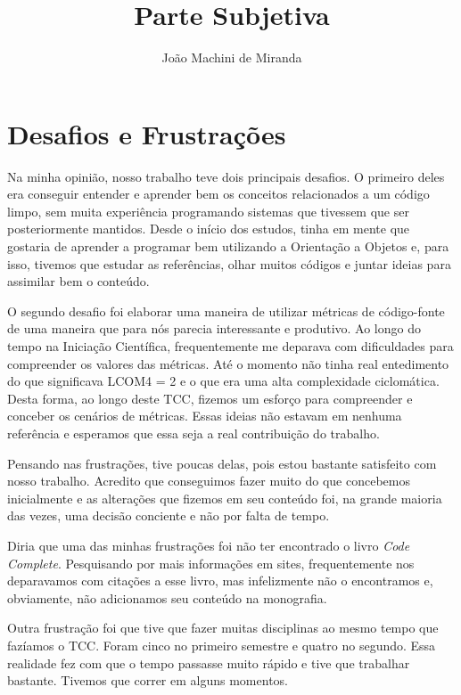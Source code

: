 \documentclass[a4paper, 11pt]{article}
\begin{document}
\onehalfspacing 


\title{Parte Subjetiva}
\author{João Machini de Miranda}
\maketitle

\section{Desafios e Frustrações}
Na minha opinião, nosso trabalho teve dois principais desafios. O primeiro deles era conseguir entender e
aprender bem os conceitos relacionados a um código limpo, sem muita experiência programando sistemas que tivessem
que ser posteriormente mantidos. Desde o início dos estudos, tinha em mente que gostaria de aprender a programar
bem utilizando a Orientação a Objetos e, para isso, tivemos que estudar as referências, olhar muitos códigos e juntar
ideias para assimilar bem o conteúdo.

O segundo desafio foi elaborar uma maneira de utilizar métricas de código-fonte de uma maneira que para nós parecia
interessante e produtivo. Ao longo do tempo na Iniciação Científica, frequentemente me deparava com dificuldades para
compreender os valores das métricas. Até o momento não tinha real entedimento do que significava LCOM4 = 2 e o que era
uma alta complexidade ciclomática. Desta forma, ao longo deste TCC, fizemos um esforço para compreender e conceber os
cenários de métricas. Essas ideias não estavam em nenhuma referência e esperamos que essa seja a real contribuição do trabalho.

Pensando nas frustrações, tive poucas delas, pois estou bastante satisfeito com nosso trabalho. Acredito que conseguimos fazer muito
do que concebemos inicialmente e as alterações que fizemos em seu conteúdo foi, na grande maioria das vezes, uma decisão conciente
e não por falta de tempo.

Diria que uma das minhas frustrações foi não ter encontrado o livro \textit{Code Complete}. Pesquisando por mais informações em sites,
frequentemente nos deparavamos com citações a esse livro, mas infelizmente não o encontramos e, obviamente, não adicionamos seu
conteúdo na monografia.

Outra frustração foi que tive que fazer muitas disciplinas ao mesmo tempo que fazíamos o TCC. Foram cinco no primeiro semestre e
quatro no segundo. Essa realidade fez com que o tempo passasse muito rápido e tive que trabalhar bastante. Tivemos que correr
em alguns momentos.
\end{document}
